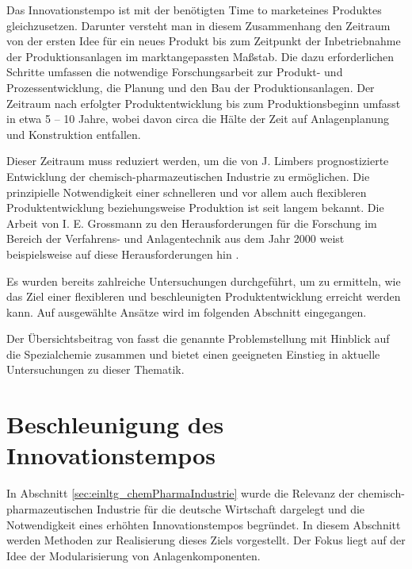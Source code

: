 Das Innovationstempo ist mit der ben\"otigten \glqq Time to market\grqq { }eines Produktes gleichzusetzen. Darunter versteht man in diesem Zusammenhang den Zeitraum von der ersten Idee f\"ur ein neues Produkt bis zum Zeitpunkt der Inbetriebnahme der Produktionsanlagen im marktangepassten Ma\ss{}stab. Die dazu erforderlichen Schritte umfassen die notwendige Forschungsarbeit zur Produkt- und Prozessentwicklung, die Planung und den Bau der Produktionsanlagen. Der Zeitraum nach erfolgter Produktentwicklung bis zum Produktionsbeginn umfasst in etwa 5 -- 10 Jahre, wobei davon circa die H\"alte der Zeit auf Anlagenplanung und Konstruktion entfallen. \cite{Schembecker_2009}

Dieser Zeitraum muss reduziert werden, um die von J. Limbers prognostizierte Entwicklung der chemisch-pharmazeutischen Industrie zu erm\"oglichen. \newline
Die prinzipielle Notwendigkeit einer schnelleren und vor allem auch flexibleren Produktentwicklung beziehungsweise Produktion ist seit langem bekannt. Die Arbeit von I. E. Grossmann zu den Herausforderungen f\"ur die Forschung im Bereich der Verfahrens- und Anlagentechnik aus dem Jahr 2000 weist beispielsweise auf diese Herausforderungen hin \cite{Grossmann_2000}.

Es wurden bereits zahlreiche Untersuchungen durchgef\"uhrt, um zu ermitteln, wie das Ziel einer flexibleren und  beschleunigten Produktentwicklung erreicht werden kann. Auf ausgew\"ahlte Ans\"atze wird im folgenden Abschnitt eingegangen.

Der \"Ubersichtsbeitrag von \citeauthor{Wachsen_2015} \cite{Wachsen_2015} fasst die genannte Problemstellung mit Hinblick auf die Spezialchemie zusammen und bietet einen geeigneten Einstieg in aktuelle Untersuchungen zu dieser Thematik. 

\section{Beschleunigung des Innovationstempos}\label{sec:einltg_beschlngInnovationstempo}
In Abschnitt \ref{sec:einltg_chemPharmaIndustrie} wurde die Relevanz der chemisch-pharmazeutischen Industrie f\"ur die deutsche Wirtschaft dargelegt und die Notwendigkeit eines erh\"ohten Innovationstempos begr\"undet. In diesem Abschnitt werden Methoden zur Realisierung dieses Ziels vorgestellt. Der Fokus liegt auf der Idee der Modularisierung von Anlagenkomponenten.

